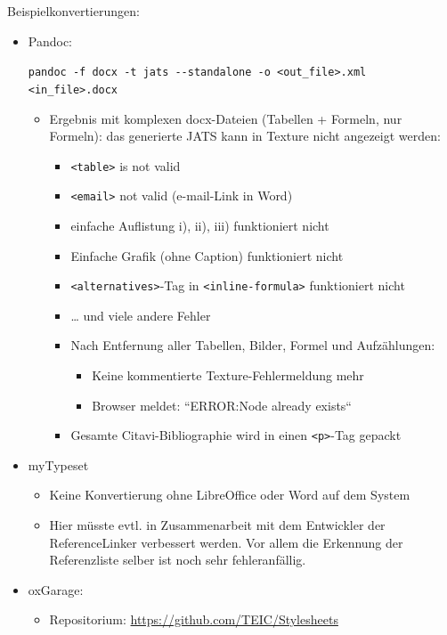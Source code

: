 \documentclass{article}
\begin{document}
Beispielkonvertierungen:
\begin{itemize}
\item Pandoc:\par
\verb+pandoc -f docx -t jats --standalone -o <out_file>.xml <in_file>.docx+
\begin{itemize}
\item Ergebnis mit komplexen docx-Dateien (Tabellen + Formeln, nur Formeln): das generierte JATS kann in Texture nicht angezeigt werden: 
\begin{itemize}
\item \verb+<table>+ is not valid
\item \verb+<email>+ not valid (e-mail-Link in Word)
\item einfache Auflistung i), ii), iii) funktioniert nicht
\item Einfache Grafik (ohne Caption) funktioniert nicht
\item \verb+<alternatives>+-Tag in \verb+<inline-formula>+ funktioniert nicht
\item … und viele andere Fehler
\item Nach Entfernung aller Tabellen, Bilder, Formel und Aufzählungen:
\begin{itemize}
\item Keine kommentierte Texture-Fehlermeldung mehr
\item Browser meldet: “ERROR:Node already exists“
\end{itemize} 
\item Gesamte Citavi-Bibliographie wird in einen \verb+<p>+-Tag gepackt
\end{itemize} 

\end{itemize} 
\item myTypeset
\begin{itemize}
\item Keine Konvertierung ohne LibreOffice oder Word auf dem System
\item Hier müsste evtl. in Zusammenarbeit mit dem Entwickler der ReferenceLinker verbessert werden. Vor allem die Erkennung der Referenzliste selber ist noch sehr fehleranfällig.
\end{itemize} 
\item oxGarage:
\begin{itemize}
\item Repositorium: \url{https://github.com/TEIC/Stylesheets}
\end{itemize} 
\end{itemize} \par
\end{document}
